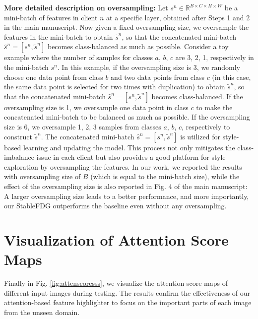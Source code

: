 \documentclass{article}
\theoremstyle{plain}
\theoremstyle{definition}
\theoremstyle{remark}
\begin{document}
\textbf{More detailed description on oversampling:} Let $s^n\in \mathbb{R}^{B \times C \times H \times W}$ be a mini-batch of features in client $n$ at a specific layer,  obtained after   Steps 1 and 2 in the main manuscript.     Now given a fixed oversampling size, we oversample the features in the mini-batch to obtain  $\tilde{s}^n$, so that the concatenated mini-batch $\hat{s}^n =  [s^n, \tilde{s}^n ]$ becomes class-balanced as much as possible. Consider a toy example where the number of samples for classes  $a$, $b$, $c$ are 3, 2, 1, respectively in the mini-batch $s^n$. In this example, if the oversampling size is 3, we randomly choose   one data point from class $b$
 and two data points from class  $c$ (in this case, the same data point is selected for two times with duplication) to obtain $ \tilde{s}^n$, so that the concatenated mini-batch $\hat{s}^n =  [s^n, \tilde{s}^n ]$ becomes class-balanced. If the oversampling size is 1, we oversample one  data point in class $c$ to make the concatenated mini-batch to be balanced as much as possible. If the oversampling size is 6, we oversample 1, 2, 3 samples from classes  $a$, $b$, $c$, respectively to construct $\tilde{s}^n$.  The concatenated mini-batch $\hat{s}^n =  [s^n, \tilde{s}^n ]$ is utilized for    style-based learning and updating the model.  This  process not only mitigates the class-imbalance issue in each client but also provides a good platform for  style exploration by oversampling the  features. In our work, we reported the results with oversampling size of $B$ (which is  equal to the mini-batch size), while  the effect of the oversampling size is also reported in Fig. 4 of the main manuscript: A larger oversampling size leads to a better performance, and more importantly, our StableFDG outperforms the baseline even without any oversampling.

\section{Visualization of Attention Score Maps}
Finally in Fig. \ref{fig:attenscoresss}, we visualize the attention score maps of different input images during testing. The results confirm the effectiveness of our attention-based feature highlighter to focus on the important parts of each image from the unseen domain.
\end{document}
